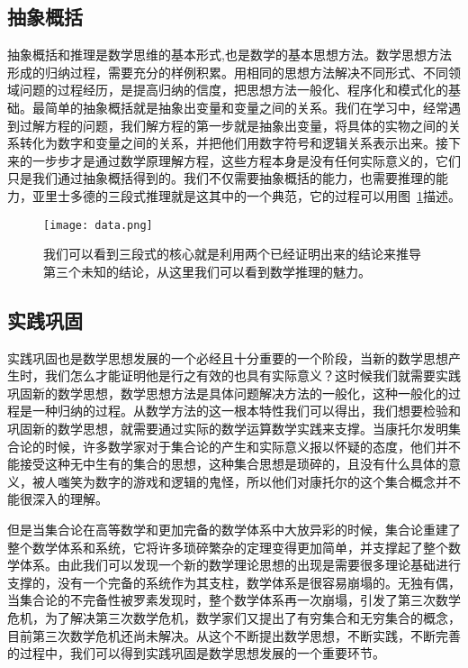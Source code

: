 \documentclass[UTF8,adobefonts]{ctexart}
\begin{document}
\subsection{抽象概括}
抽象概括和推理是数学思维的基本形式,也是数学的基本思想方法\cite{史宁中2011漫谈数学的基本思想}。数学思想方法形成的归纳过程，需要充分的样例积累。用相同的思想方法解决不同形式、不同领域问题的过程经历，是提高归纳的信度，把思想方法一般化、程序化和模式化的基础。最简单的抽象概括就是抽象出变量和变量之间的关系。我们在学习中，经常遇到过解方程的问题，我们解方程的第一步就是抽象出变量，将具体的实物之间的关系转化为数字和变量之间的关系，并把他们用数字符号和逻辑关系表示出来。接下来的一步步才是通过数学原理解方程，这些方程本身是没有任何实际意义的，它们只是我们通过抽象概括得到的。我们不仅需要抽象概括的能力，也需要推理的能力，亚里士多德的三段式推理就是这其中的一个典范，它的过程可以用图~\ref{fig:process}描述。
\begin{figure}
\begin{center}
\texttt{[image: data.png]}
\hspace{0.05in}
\caption{我们可以看到三段式的核心就是利用两个已经证明出来的结论来推导第三个未知的结论，从这里我们可以看到数学推理的魅力。}
\label{fig:process}
\end{center}
\end{figure}

\subsection{实践巩固}
实践巩固也是数学思想发展的一个必经且十分重要的一个阶段，当新的数学思想产生时，我们怎么才能证明他是行之有效的也具有实际意义？这时候我们就需要实践巩固新的数学思想，数学思想方法是具体问题解决方法的一般化，这种一般化的过程是一种归纳的过程\cite{李大潜2008数学文化与数学教养}。从数学方法的这一根本特性我们可以得出，我们想要检验和巩固新的数学思想，就需要通过实际的数学运算数学实践来支撑。当康托尔发明集合论的时候，许多数学家对于集合论的产生和实际意义报以怀疑的态度，他们并不能接受这种无中生有的集合的思想，这种集合思想是琐碎的，且没有什么具体的意义，被人嗤笑为数字的游戏和逻辑的鬼怪，所以他们对康托尔的这个集合概念并不能很深入的理解。\par
但是当集合论在高等数学和更加完备的数学体系中大放异彩的时候，集合论重建了整个数学体系和系统，它将许多琐碎繁杂的定理变得更加简单，并支撑起了整个数学体系。由此我们可以发现一个新的数学理论思想的出现是需要很多理论基础进行支撑的，没有一个完备的系统作为其支柱，数学体系是很容易崩塌的。无独有偶，当集合论的不完备性被罗素发现时，整个数学体系再一次崩塌，引发了第三次数学危机，为了解决第三次数学危机，数学家们又提出了有穷集合和无穷集合的概念，目前第三次数学危机还尚未解决。从这个不断提出数学思想，不断实践，不断完善的过程中，我们可以得到实践巩固是数学思想发展的一个重要环节。
\end{document}
